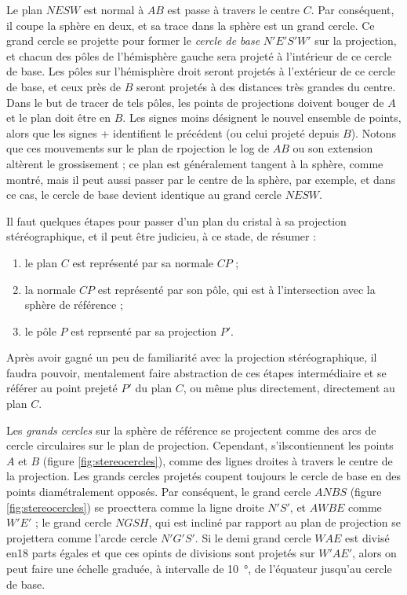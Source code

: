 Le plan $NESW$ est normal à $AB$ est passe à travers le centre $C$. Par conséquent, il coupe la sphère en deux, et sa trace dans la sphère est un grand cercle. Ce grand cercle se projette pour former le \emph{cercle de base} $N'E'S'W'$ sur la projection, et chacun des pôles de l'hémisphère gauche sera projeté à l'intérieur de ce cercle de base. Les pôles sur l'hémisphère droit seront projetés à l'extérieur de ce cercle de base, et ceux près de $B$ seront projetés à des distances très grandes du centre. Dans le but de tracer de tels pôles, les points de projections doivent bouger de $A$ et le plan doit être en $B$. Les signes moins désignent le nouvel ensemble de points, alors que les signes + identifient le précédent (ou celui projeté depuis $B$).
Notons que ces mouvements sur le plan de rpojection le log de $AB$ ou son extension altèrent le grossisement ; ce plan est généralement tangent à la sphère, comme montré, mais il peut aussi passer par le centre de la sphère, par exemple, et dans ce cas, le cercle de base devient identique au grand cercle $NESW$.

Il faut quelques étapes pour passer d'un plan du cristal à sa projection stéréographique, et il peut être judicieu, à ce stade, de résumer :

\begin{enumerate}
    \item le plan $C$ est représenté par sa normale $CP$ ;
    \item la normale $CP$ est représenté par son pôle, qui est à l'intersection avec la sphère de référence ;
    \item le pôle $P$ est reprsenté par sa projection $P'$.
\end{enumerate}

Après avoir gagné un peu de familiarité avec la projection stéréographique, il faudra pouvoir, mentalement faire abstraction de ces étapes intermédiaire et se référer au point prejeté $P'$ du plan $C$, ou même plus directement, directement au plan $C$.

Les \emph{grands cercles} sur la sphère de référence se projectent comme des arcs de cercle circulaires sur le plan de projection. Cependant, s'ilscontiennent les points $A$ et $B$ (figure \ref{fig:stereocercles}), comme des lignes droites à travers le centre de la projection. Les grands cercles projetés coupent toujours le cercle de base en des points diamétralement opposés. Par conséquent, le grand cercle $ANBS$ (figure \ref{fig:stereocercles}) se proecttera comme la ligne droite $N'S'$, et $AWBE$ comme $W'E'$ ; le grand cercle $NGSH$, qui est incliné par rapport au plan de projection se projettera comme l'arcde cercle $N'G'S'$. Si le demi grand cercle $WAE$ est divisé en18 parts égales et que ces opints de divisions sont projetés sur $W'AE'$, alors on peut faire une échelle graduée, à intervalle de \SI{10}{\degree}, de l'équateur jusqu'au cercle de base.

